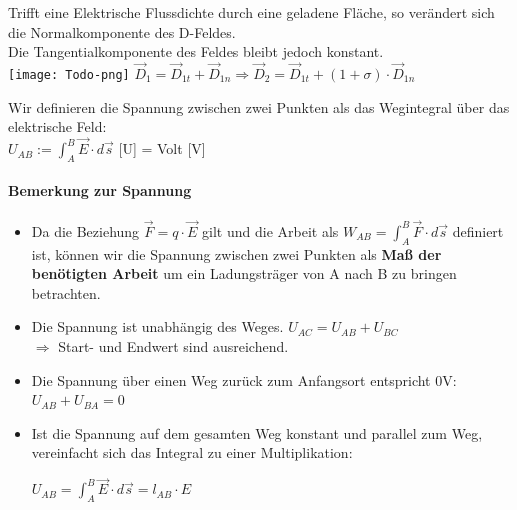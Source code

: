 \iend



\beginip
Trifft eine Elektrische Flussdichte durch eine geladene Fläche, so verändert sich die Normalkomponente des D-Feldes. \\
Die Tangentialkomponente des Feldes bleibt jedoch konstant. \\

\texttt{[image: Todo-png]}
\formulaBegin
$\vec{D}_1 = \vec{D}_{1t} + \vec{D}_{1n} \Rightarrow \vec{D}_2 = \vec{D}_{1t} + (1 + \sigma) \cdot \vec{D}_{1n}$
\formulaEnd
\iend


\beginip
Wir definieren die Spannung zwischen zwei Punkten als das Wegintegral über das elektrische Feld: \\
\formulaBegin
$ U_{AB} :=  \int_A^B \vec{E} \cdot d\vec{s} $
\formulaEnd
{[U]} = Volt {[V]}
\iend

\paragraph{Bemerkung zur Spannung}

\begin{itemize}

	\item	Da die Beziehung $\vec{F} =  q \cdot \vec{E} $ gilt und die Arbeit als $ W_{AB} = \int_A^B \vec{F} \cdot d\vec{s}$ definiert ist, können wir die Spannung zwischen zwei Punkten als \textbf{Maß der benötigten Arbeit} um ein Ladungsträger von A nach B zu bringen betrachten.  \\
	\item Die Spannung ist unabhängig des Weges.  $U_{AC} = U_{AB} + U_{BC}$
	      \\ $\Rightarrow$ Start- und Endwert sind ausreichend. \\
	\item Die Spannung über einen Weg zurück zum Anfangsort entspricht 0V: $U_{AB} + U_{BA} = 0$ \\
	\item Ist die Spannung auf dem gesamten Weg konstant und parallel zum Weg, vereinfacht sich das Integral zu einer Multiplikation: \\
	      \begin{center}
	      	$ U_{AB} = \int_{A}^{B} \vec{E}\cdot d\vec{s} = l_{AB} \cdot E$
	      \end{center}
\end{itemize}


